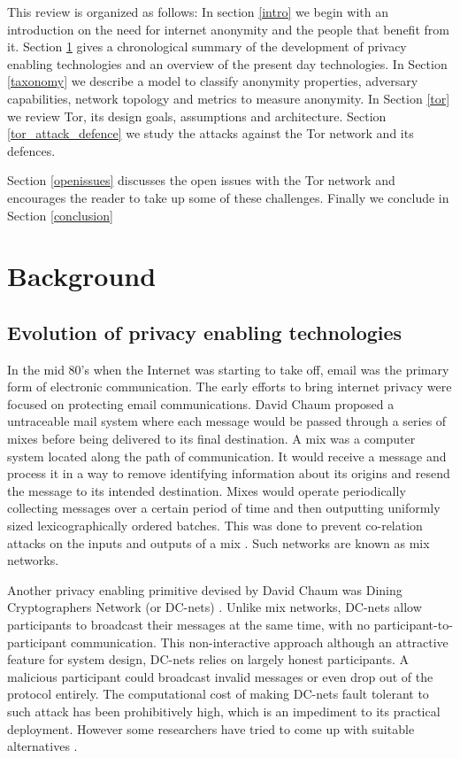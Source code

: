 \documentclass{llncs}
\begin{document}
This review is organized as follows: In section \ref{intro} we begin with an introduction on the need for internet anonymity and the people that benefit from it. Section \ref{background} gives a chronological summary of the development of privacy enabling technologies and an overview of the present day technologies. In Section \ref{taxonomy} we describe a model to classify anonymity properties, adversary capabilities, network topology and metrics to measure anonymity. 
In Section \ref{tor} we review Tor, its design goals, assumptions and architecture. Section \ref{tor_attack_defence} we study the attacks against the Tor network and its defences.

Section \ref{openissues} discusses the open issues with the Tor network and encourages the reader to take up some of these challenges. Finally we conclude in Section \ref{conclusion}

\section{Background} \label{background}
\subsection{Evolution of privacy enabling technologies}

In the mid 80's when the Internet was starting to take off, email was the primary form of electronic communication. The early efforts to bring internet privacy were focused on protecting email communications. David Chaum proposed a untraceable mail system where each message would be passed through a series of mixes before being delivered to its final destination. A mix was a computer system located along the path of communication. It would receive a message and process it in a way to remove identifying information about its origins and resend the message to its intended destination. Mixes would operate periodically collecting messages over a certain period of time and then outputting uniformly sized lexicographically ordered batches. This was done to prevent co-relation attacks on the inputs and outputs of a mix \cite{chaum-mix}. Such networks are known as mix networks.

Another privacy enabling primitive devised by David Chaum was Dining Cryptographers Network (or DC-nets) \cite{chaum-dc}. Unlike mix networks, DC-nets allow participants to broadcast their messages at the same time, with no participant-to-participant communication. This non-interactive approach although an attractive feature for system design, DC-nets relies on largely honest participants. A malicious participant could broadcast invalid messages or even drop out of the protocol entirely. The computational cost of making DC-nets fault tolerant to such attack has been prohibitively high, which is an impediment to its practical deployment. However some researchers have tried to come up with suitable alternatives \cite{golle:eurocrypt2004}.
\end{document}
